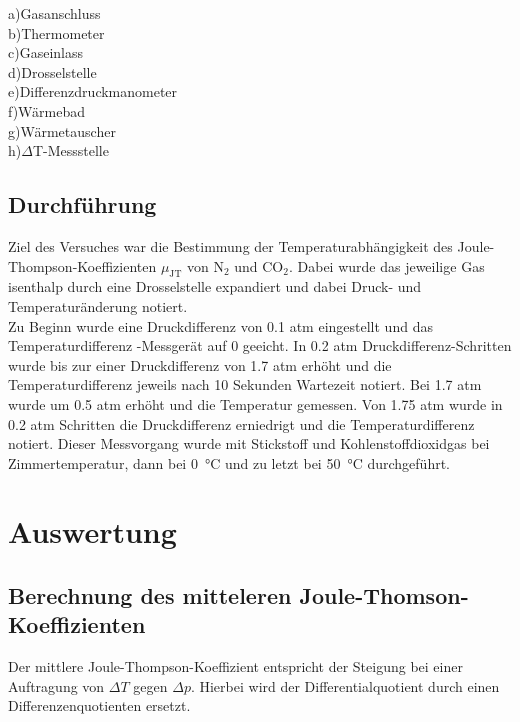 \documentclass[a4paper,12pt,oneside,onecolum,final,openany]{report}
\begin{document}
a)Gasanschluss\\
b)Thermometer\\
c)Gaseinlass\\
d)Drosselstelle\\
e)Differenzdruckmanometer\\
f)Wärmebad\\
g)Wärmetauscher\\
h)$\Delta$T-Messstelle\\

\section{Durchführung}
Ziel des Versuches war die Bestimmung der Temperaturabhängigkeit des Joule-Thompson-Koeffizienten $\mu_\mathrm{JT}$ von $\mathrm{N}_2$ und $\mathrm{CO}_2$. Dabei wurde das jeweilige Gas isenthalp durch eine Drosselstelle expandiert und dabei Druck- und Temperaturänderung notiert.\\

Zu Beginn wurde eine Druckdifferenz von 0.1 atm eingestellt und das Temperaturdifferenz -Messgerät auf 0 geeicht. 
In 0.2 atm Druckdifferenz-Schritten wurde bis zur einer Druckdifferenz von 1.7 atm erhöht und die Temperaturdifferenz jeweils nach 10 Sekunden Wartezeit notiert. Bei 1.7 atm wurde um 0.5 atm erhöht und die Temperatur gemessen. Von 1.75 atm wurde in 0.2 atm Schritten die Druckdifferenz erniedrigt und die Temperaturdifferenz notiert. Dieser Messvorgang wurde mit Stickstoff und Kohlenstoffdioxidgas bei Zimmertemperatur, dann bei 0~°C und zu letzt bei 50~°C durchgeführt.
\chapter{Auswertung}



\section{Berechnung des mitteleren Joule-Thomson-Koeffizienten}
Der mittlere Joule-Thompson-Koeffizient entspricht der Steigung bei einer Auftragung von $\Delta T$ gegen $\Delta p$. Hierbei wird der Differentialquotient durch einen Differenzenquotienten ersetzt.\\
\end{document}
